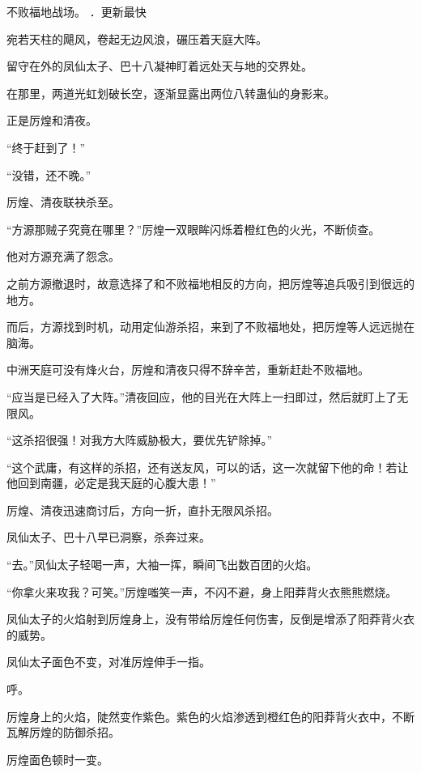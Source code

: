 
\begin{this_body}



不败福地战场。 ．更新最快

宛若天柱的飓风，卷起无边风浪，碾压着天庭大阵。

留守在外的凤仙太子、巴十八凝神盯着远处天与地的交界处。

在那里，两道光虹划破长空，逐渐显露出两位八转蛊仙的身影来。

正是厉煌和清夜。

“终于赶到了！”

“没错，还不晚。”

厉煌、清夜联袂杀至。

“方源那贼子究竟在哪里？”厉煌一双眼眸闪烁着橙红色的火光，不断侦查。

他对方源充满了怨念。

之前方源撤退时，故意选择了和不败福地相反的方向，把厉煌等追兵吸引到很远的地方。

而后，方源找到时机，动用定仙游杀招，来到了不败福地处，把厉煌等人远远抛在脑海。

中洲天庭可没有烽火台，厉煌和清夜只得不辞辛苦，重新赶赴不败福地。

“应当是已经入了大阵。”清夜回应，他的目光在大阵上一扫即过，然后就盯上了无限风。

“这杀招很强！对我方大阵威胁极大，要优先铲除掉。”

“这个武庸，有这样的杀招，还有送友风，可以的话，这一次就留下他的命！若让他回到南疆，必定是我天庭的心腹大患！”

厉煌、清夜迅速商讨后，方向一折，直扑无限风杀招。

凤仙太子、巴十八早已洞察，杀奔过来。

“去。”凤仙太子轻喝一声，大袖一挥，瞬间飞出数百团的火焰。

“你拿火来攻我？可笑。”厉煌嗤笑一声，不闪不避，身上阳莽背火衣熊熊燃烧。

凤仙太子的火焰射到厉煌身上，没有带给厉煌任何伤害，反倒是增添了阳莽背火衣的威势。

凤仙太子面色不变，对准厉煌伸手一指。

呼。

厉煌身上的火焰，陡然变作紫色。紫色的火焰渗透到橙红色的阳莽背火衣中，不断瓦解厉煌的防御杀招。

厉煌面色顿时一变。


\end{this_body}
